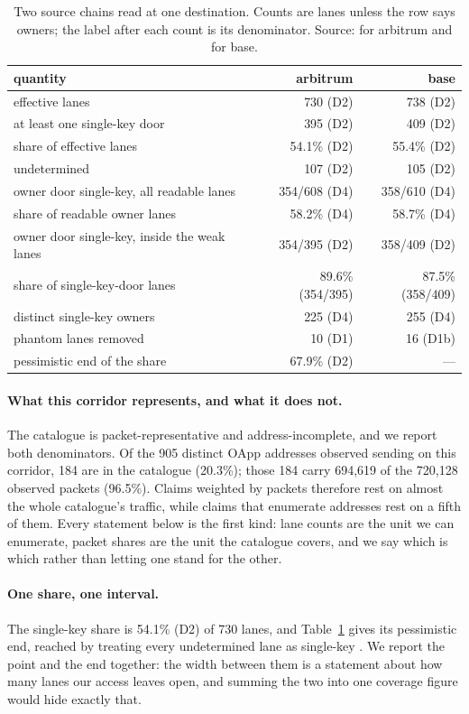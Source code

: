 \documentclass[10pt,a4paper]{article}
\newcommand{\code}[1]{\texttt{\detokenize{#1}}}
\begin{document}
\begin{table}[t]
\centering
\small
\caption{Two source chains read at one destination. Counts are lanes unless the row says owners; the
label after each count is its denominator. Source: \code{[RESULTS:R1,R2,R3,R7]} for arbitrum and
\code{[BASE-LANES:3]} for base.}
\label{tab:twochains}
\begin{tabular}{@{}lrr@{}}
\toprule
quantity & arbitrum & base\\
\midrule
effective lanes & 730 (D2) & 738 (D2)\\
at least one single-key door & 395 (D2) & 409 (D2)\\
share of effective lanes & 54.1\% (D2) & 55.4\% (D2)\\
undetermined & 107 (D2) & 105 (D2)\\
owner door single-key, all readable lanes & 354/608 (D4) & 358/610 (D4)\\
share of readable owner lanes & 58.2\% (D4) & 58.7\% (D4)\\
owner door single-key, inside the weak lanes & 354/395 (D2) & 358/409 (D2)\\
share of single-key-door lanes & 89.6\% (354/395) & 87.5\% (358/409)\\
distinct single-key owners & 225 (D4) & 255 (D4)\\
phantom lanes removed & 10 (D1) & 16 (D1b)\\
pessimistic end of the share & 67.9\% (D2) & ---\\
\bottomrule
\end{tabular}
\end{table}

\paragraph{What this corridor represents, and what it does not.}
The catalogue is packet-representative and address-incomplete, and we report both denominators. Of the 905
distinct OApp addresses observed sending on this corridor, 184 are in the catalogue (20.3\%); those 184 carry
694,619 of the 720,128 observed packets (96.5\%). Claims weighted by packets therefore rest on almost the whole
catalogue's traffic, while claims that enumerate addresses rest on a fifth of them. Every statement below is
the first kind: lane counts are the unit we can enumerate, packet shares are the unit the catalogue covers,
and we say which is which rather than letting one stand for the other.
\paragraph{One share, one interval.}
The single-key share is 54.1\% (D2) of 730 lanes, and Table~\ref{tab:twochains} gives its pessimistic end,
reached by treating every undetermined lane as single-key \code{[RESULTS:R2]}. We report the point and the
end together: the width between them is a statement about how many lanes our access leaves open, and
summing the two into one coverage figure would hide exactly that.
\end{document}
